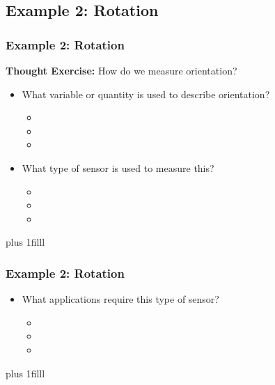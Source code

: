 \documentclass[fleqn]{beamer} %
\newcommand{\sectionIsubsectionIVtitle}{Example 2: Rotation}
\newcommand{\btVFill}{\vskip0pt plus 1filll}
\begin{document}
		\subsection{\sectionIsubsectionIVtitle}\label{sectionIsubsectionIV}		

			\begin{frame}
				\frametitle{\sectionIsubsectionIVtitle}
				{\bf Thought Exercise:} How do we measure {\PR orientation}?        
	
				\begin{itemize}
					
					\item What variable or quantity is used to describe {\PR orientation}?                         
					\begin{itemize}
						\item
						\item
						\item	
					\end{itemize} \vspace{5mm}
					\item What type of sensor is used to measure this?
					\begin{itemize}
						\item
						\item
						\item	
					\end{itemize}	
					
				\end{itemize}
				
				\btVFill
	
			\end{frame}

			\begin{frame}
				\frametitle{\sectionIsubsectionIVtitle}

				\begin{itemize}
					\item What applications require this type of sensor?
					\begin{itemize}
						\item \vspace{5mm}
						\item \vspace{5mm}
						\item \vspace{5mm}	
					\end{itemize}
				\end{itemize}
				
				\btVFill
			\end{frame}
\end{document}
